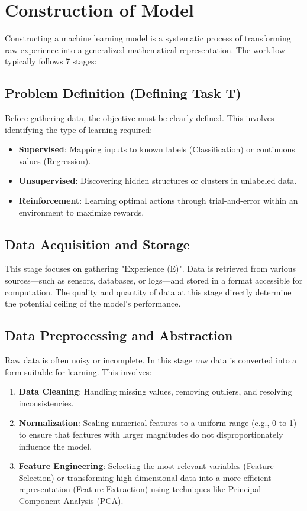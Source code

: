 \documentclass[12pt]{article}
\begin{document}
\section{Construction of Model}
Constructing a machine learning model is a systematic process of transforming raw experience into a generalized mathematical representation. The workflow typically follows 7 stages:

\subsection{Problem Definition (Defining Task T)}

Before gathering data, the objective must be clearly defined. This involves identifying the type of learning required:

\begin{itemize}
  \item \textbf{Supervised}: Mapping inputs to known labels (Classification) or continuous values (Regression).
  \item \textbf{Unsupervised}: Discovering hidden structures or clusters in unlabeled data.
  \item \textbf{Reinforcement}: Learning optimal actions through trial-and-error within an environment to maximize rewards.
\end{itemize}

\subsection{Data Acquisition and Storage}

This stage focuses on gathering "Experience (E)". Data is retrieved from various sources—such as sensors, databases, or logs—and stored in a format accessible for computation. The quality and quantity of data at this stage directly determine the potential ceiling of the model's performance.

\subsection{Data Preprocessing and Abstraction}

Raw data is often noisy or incomplete. In this stage raw data is converted into a form suitable for learning. This involves:
\begin{enumerate}
  \item \textbf{Data Cleaning}: Handling missing values, removing outliers, and resolving inconsistencies.
  \item \textbf{Normalization}: Scaling numerical features to a uniform range (e.g., 0 to 1) to ensure that features with larger magnitudes do not disproportionately influence the model.
  \item \textbf{Feature Engineering}: Selecting the most relevant variables (Feature Selection) or transforming high-dimensional data into a more efficient representation (Feature Extraction) using techniques like Principal Component Analysis (PCA).
\end{enumerate}
\end{document}
